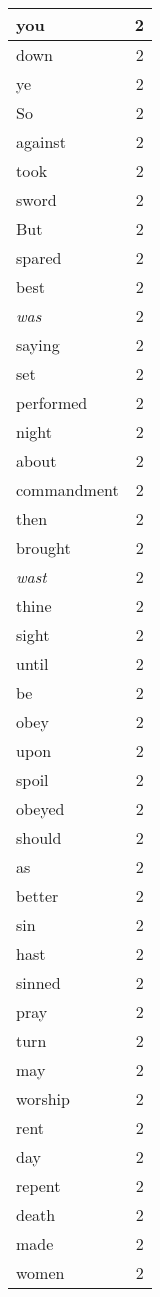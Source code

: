 \begin{center}
\begin{longtable}{l|r}
you & 2 \\ \hline
down & 2 \\ \hline
ye & 2 \\ \hline
So & 2 \\ \hline
against & 2 \\ \hline
took & 2 \\ \hline
sword & 2 \\ \hline
But & 2 \\ \hline
spared & 2 \\ \hline
best & 2 \\ \hline
\emph{was} & 2 \\ \hline
saying & 2 \\ \hline
set & 2 \\ \hline
performed & 2 \\ \hline
night & 2 \\ \hline
about & 2 \\ \hline
commandment & 2 \\ \hline
then & 2 \\ \hline
brought & 2 \\ \hline
\emph{wast} & 2 \\ \hline
thine & 2 \\ \hline
sight & 2 \\ \hline
until & 2 \\ \hline
be & 2 \\ \hline
obey & 2 \\ \hline
upon & 2 \\ \hline
spoil & 2 \\ \hline
obeyed & 2 \\ \hline
should & 2 \\ \hline
as & 2 \\ \hline
better & 2 \\ \hline
sin & 2 \\ \hline
hast & 2 \\ \hline
sinned & 2 \\ \hline
pray & 2 \\ \hline
turn & 2 \\ \hline
may & 2 \\ \hline
worship & 2 \\ \hline
rent & 2 \\ \hline
day & 2 \\ \hline
repent & 2 \\ \hline
death & 2 \\ \hline
made & 2 \\ \hline
women & 2 \\ \hline

\end{longtable}
\end{center}
